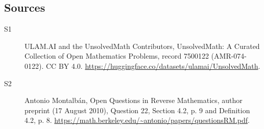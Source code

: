 \documentclass[11pt]{article}
\begin{document}
\subsection{Sources}
\begin{description}
\item[\hypertarget{source:7500122:1}{S1}] ULAM.AI and the UnsolvedMath Contributors, UnsolvedMath: A Curated Collection of Open Mathematics Problems, record 7500122 (AMR-074-0122). CC BY 4.0. \url{https://huggingface.co/datasets/ulamai/UnsolvedMath}.
\item[\hypertarget{source:7500122:2}{S2}] Antonio Montalbán, Open Questions in Reverse Mathematics, author preprint (17 August 2010), Question 22, Section 4.2, p. 9 and Definition 4.2, p. 8. \url{https://math.berkeley.edu/~antonio/papers/questionsRM.pdf}.
\end{description}
\label{end:7500122}
\end{document}
